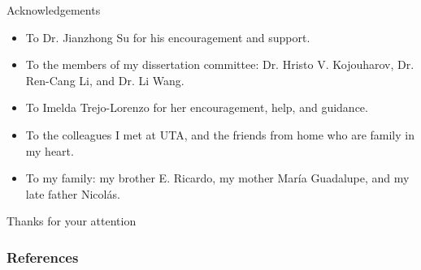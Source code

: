 \documentclass[progressbar=head]{beamer}
\begin{document}
\begin{frame}{Acknowledgements}
\begin{itemize}
\item To Dr. Jianzhong Su for his encouragement and support.
\item To the members of my dissertation committee: Dr. Hristo V. Kojouharov, Dr. Ren-Cang Li, and Dr. Li Wang.
\item To Imelda Trejo-Lorenzo for her encouragement, help, and guidance.
\item To the colleagues I met at UTA, and the friends from home who are family in my heart.
\item To my family: my brother E. Ricardo, my mother Mar\'ia Guadalupe, and my late father Nicol\'as.
\end{itemize}
\end{frame}

\begin{frame}{Thanks for your attention}

\end{frame}



\begin{frame}[allowframebreaks]
  \frametitle{References}
  \printbibliography
\end{frame}
\end{document}
